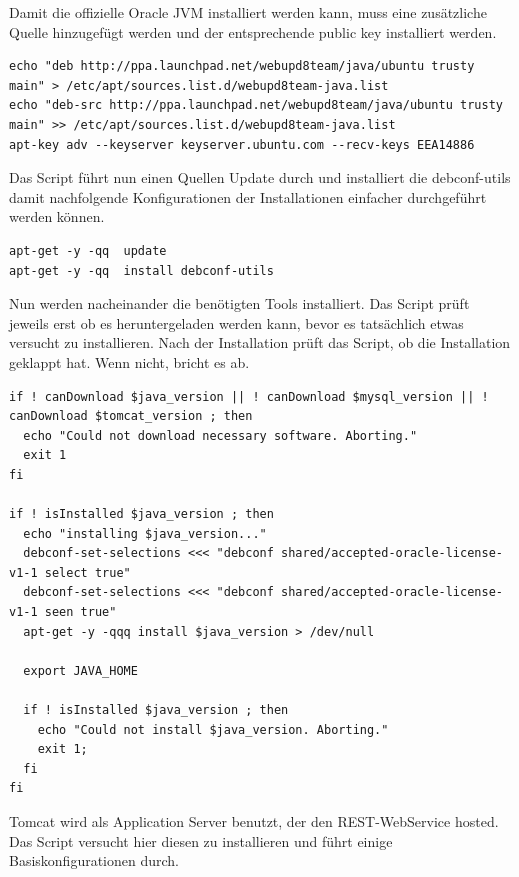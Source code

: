 \documentclass[]{article}
\begin{document}
Damit die offizielle Oracle JVM installiert werden kann, muss eine
zusätzliche Quelle hinzugefügt werden und der entsprechende public key
installiert werden.

\begin{verbatim}
echo "deb http://ppa.launchpad.net/webupd8team/java/ubuntu trusty main" > /etc/apt/sources.list.d/webupd8team-java.list
echo "deb-src http://ppa.launchpad.net/webupd8team/java/ubuntu trusty main" >> /etc/apt/sources.list.d/webupd8team-java.list
apt-key adv --keyserver keyserver.ubuntu.com --recv-keys EEA14886
\end{verbatim}

Das Script führt nun einen Quellen Update durch und installiert die
debconf-utils damit nachfolgende Konfigurationen der Installationen
einfacher durchgeführt werden können.

\begin{verbatim}
apt-get -y -qq  update
apt-get -y -qq  install debconf-utils
\end{verbatim}

Nun werden nacheinander die benötigten Tools installiert. Das Script
prüft jeweils erst ob es heruntergeladen werden kann, bevor es
tatsächlich etwas versucht zu installieren. Nach der Installation prüft
das Script, ob die Installation geklappt hat. Wenn nicht, bricht es ab.

\begin{verbatim}
if ! canDownload $java_version || ! canDownload $mysql_version || ! canDownload $tomcat_version ; then
  echo "Could not download necessary software. Aborting."
  exit 1
fi

if ! isInstalled $java_version ; then
  echo "installing $java_version..."
  debconf-set-selections <<< "debconf shared/accepted-oracle-license-v1-1 select true"
  debconf-set-selections <<< "debconf shared/accepted-oracle-license-v1-1 seen true"
  apt-get -y -qqq install $java_version > /dev/null

  export JAVA_HOME

  if ! isInstalled $java_version ; then
    echo "Could not install $java_version. Aborting."
    exit 1; 
  fi
fi
\end{verbatim}

Tomcat wird als Application Server benutzt, der den REST-WebService
hosted. Das Script versucht hier diesen zu installieren und führt einige
Basiskonfigurationen durch.
\end{document}
